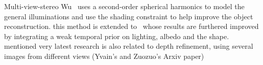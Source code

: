Multi-view-stereo 
Wu~\cite{wu2011high} uses a second-order spherical harmonics to model the general illuminations and use the shading constraint to help improve the object reconstruction.
this method is extended to~\cite{wu2011shading} whose results are furthered improved by integrating a weak temporal prior on lighting, albedo and the shape.
mentioned very latest research is also related to depth refinement, using several images from different views (Yvain's and Zuozuo's Arxiv paper) 

%
%
